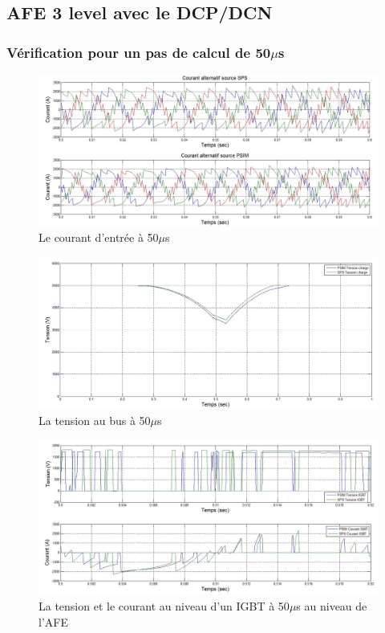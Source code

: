 \documentclass[11pt,letterpaper,final]{report}
\begin{document}
\subsection{AFE 3 level avec le DCP/DCN}
\subsubsection{Vérification pour un pas de calcul de 50$\mu$s}

\begin{figure}[htb]
\centering
\includegraphics[scale=0.5]{Fig/DCP_AFE/50u/cour_al.jpg}
\caption{Le courant d'entrée à 50$\mu$s}
\label{AF_DC_cou50}
\end{figure}

\begin{figure}[htb]
\centering
\includegraphics[scale=0.5]{Fig/DCP_AFE/50u/ten_bus.jpg}
\caption{La tension au bus à 50$\mu$s}
\label{AF_DC_vch50}
\end{figure}


\begin{figure}[htb]
\centering
\includegraphics[scale=0.5]{Fig/DCP_AFE/50u/IGBT_afe.jpg}
\caption{La tension et le courant au niveau d'un IGBT à 50$\mu$s au niveau de l'AFE}
\label{AF_DC_IGBT50}
\end{figure}
\end{document}
